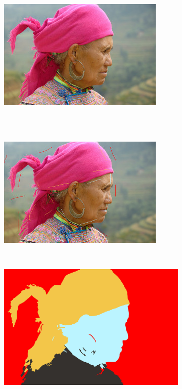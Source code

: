 \begin{figure}[htb]
 \centering
 \begin{subfigure}{0.4\textwidth}	
\includegraphics[width=\textwidth]{images/evaluation/010.jpg}
 \end{subfigure}
 \\~\\
 \begin{subfigure}{0.4\textwidth}	
\includegraphics[width=\textwidth]{images/evaluation/010_seeds1.jpg}
 \end{subfigure}
 ~
 \begin{subfigure}{0.4\textwidth}	
\includegraphics[width=\textwidth]{images/evaluation/010_res1.jpg}

\end{subfigure}
\end{figure}
